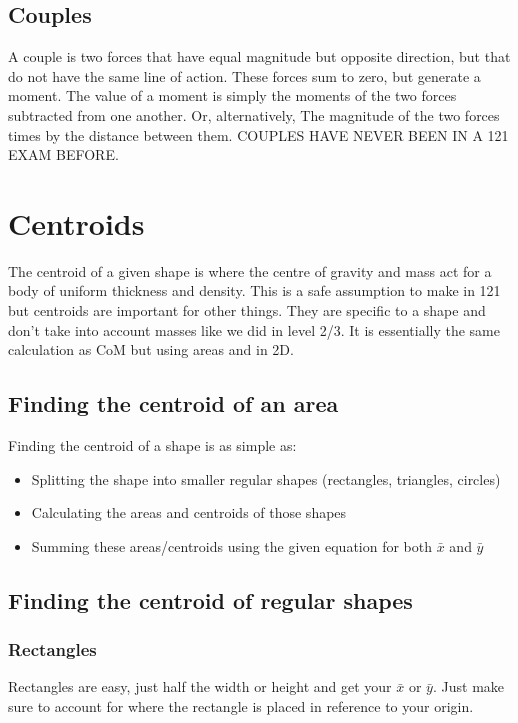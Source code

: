 \documentclass[a4paper, 12pt]{article}
\begin{document}
\newpage
\subsection{Couples}
A couple is two forces that have equal magnitude but opposite direction, but that do not have the same line of action.
These forces sum to zero, but generate a moment. The value of a moment is simply the moments of the two forces subtracted from one another.
Or, alternatively, The magnitude of the two forces times by the distance between them.
COUPLES HAVE NEVER BEEN IN A 121 EXAM BEFORE.

\section{Centroids}
The centroid of a given shape is where the centre of gravity and mass act for a body of uniform thickness and density.
This is a safe assumption to make in 121 but centroids are important for other things. 
They are specific to a shape and don't take into account masses like we did in level 2/3. 
It is essentially the same calculation as CoM but using areas and in 2D. 

\subsection{Finding the centroid of an area}
Finding the centroid of a shape is as simple as:
\begin{itemize}
    \item Splitting the shape into smaller regular shapes (rectangles, triangles, circles)
    \item Calculating the areas and centroids of those shapes
    \item Summing these areas/centroids using the given equation for both $\bar{x}$ and $\bar{y}$
\end{itemize}

\subsection{Finding the centroid of regular shapes}
\subsubsection{Rectangles}
Rectangles are easy, just half the width or height and get your $\bar{x}$ or $\bar{y}$.
Just make sure to account for where the rectangle is placed in reference to your origin.
\end{document}
